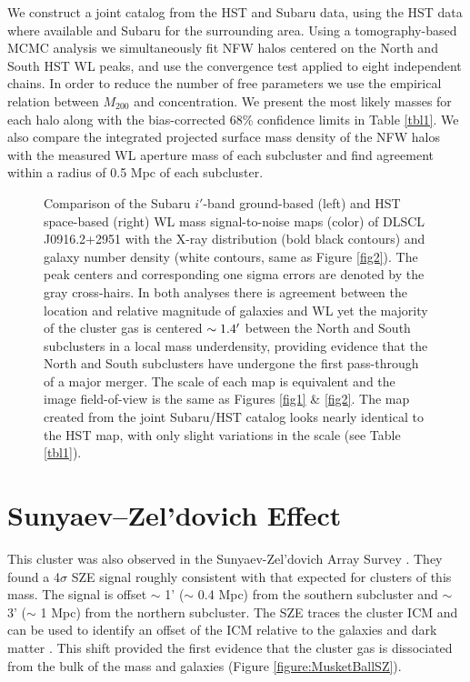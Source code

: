 We construct a joint catalog from the HST and Subaru data, using the HST data where available and Subaru for the surrounding area.
Using a tomography-based MCMC analysis we simultaneously fit NFW halos centered on the North and South HST WL peaks, and use the \citet{Gelman:1992ht} convergence test applied to eight independent chains.
In order to reduce the number of free parameters we use the \citet{Duffy:2008jy} empirical relation between $M_{200}$ and concentration.
We present the most likely masses for each halo along with the bias-corrected 68\% confidence limits in Table \ref{tbl1}.
We also compare the integrated projected surface mass density of the NFW halos with the measured WL aperture mass \citep{Fahlman:1994eb} of each subcluster and find agreement within a radius of 0.5 Mpc of each subcluster.

\begin{figure}
\caption[Comparison of the Subaru $i'$-band ground-based and HST space-based  WL mass signal-to-noise maps of DLSCL J0916.2+2951 with the X-ray distribution and galaxy number density.]{Comparison of the Subaru $i'$-band ground-based (left) and HST space-based (right) WL mass signal-to-noise maps (color) of DLSCL J0916.2+2951 with the X-ray distribution (bold black contours) and galaxy number density (white contours, same as Figure \ref{fig2}). The peak centers and corresponding one sigma errors are denoted by the gray cross-hairs.
In both analyses there is agreement between the location and relative magnitude of galaxies and WL yet the majority of the cluster gas is centered $\sim1.4\mbox{$^\prime$}$ between the North and South subclusters in a local mass underdensity, providing evidence that the North and South subclusters have undergone the first pass-through of a major merger.
The scale of each map is equivalent and the image field-of-view is the same as Figures \ref{fig1} \& \ref{fig2}.
The map created from the joint Subaru/HST catalog looks nearly identical to the HST map, with only slight variations in the scale (see Table \ref{tbl1}).
\label{fig3}}
\end{figure}

\section{Sunyaev--Zel'dovich Effect}

This cluster was also observed in the Sunyaev-Zel'dovich Array Survey \citep{Muchovej:2010gc}.  
They found a 4{$\sigma$} SZE signal roughly consistent with that expected for clusters of this mass.
The signal is offset $\sim$ 1' ($\sim$ 0.4 Mpc) from the southern subcluster and $\sim$ 3' ($\sim$ 1 Mpc) from the northern subcluster.
The SZE traces the cluster ICM and can be used to identify an offset of the ICM relative to the galaxies and dark matter \citep[as in the case of the Bullet Cluster][]{Halverson:2009gn}.
This shift provided the first evidence that the cluster gas is dissociated from the bulk of the mass and galaxies (Figure \ref{figure:MusketBallSZ}).

